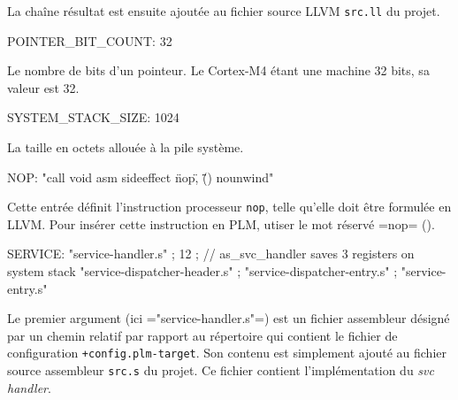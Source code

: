 La chaîne résultat est ensuite ajoutée au fichier source LLVM \texttt{src.ll} du projet.








\begin{PLM}
POINTER_BIT_COUNT:
  32
\end{PLM}

Le nombre de bits d'un pointeur. Le Cortex-M4 étant une machine 32 bits, sa valeur est 32.













\begin{PLM}
SYSTEM_STACK_SIZE:
  1024
\end{PLM}

La taille en octets allouée à la pile système.







\begin{PLM}
NOP:
  "call void asm sideeffect \"nop\", \"\"() nounwind"
\end{PLM}

Cette entrée définit l'instruction processeur \texttt{nop}, telle qu'elle doit être formulée en LLVM. Pour insérer cette instruction en PLM, utiser le mot réservé \plm=nop= ().






\begin{PLM}
SERVICE:
  "service-handler.s" ;
  12 ; // as_svc_handler saves 3 registers on system stack
  "service-dispatcher-header.s" ;
  "service-dispatcher-entry.s" ;
  "service-entry.s"
\end{PLM}

Le premier argument (ici \plm="service-handler.s"=) est un fichier assembleur désigné par un chemin relatif par rapport au répertoire qui contient le fichier de configuration \texttt{+config.plm-target}. Son contenu est simplement ajouté au fichier source assembleur \texttt{src.s} du projet. Ce fichier contient l'implémentation du \emph{svc handler}.

